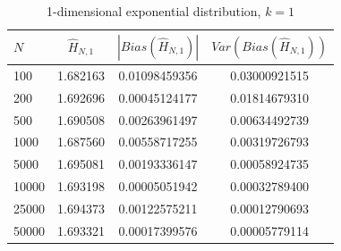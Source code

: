 \documentclass{article}
\begin{document}
\begin{table}
\caption{1-dimensional exponential distribution, $k=1$} \label{expo_k=1_table}
\begin{center}
\begin{tabular}{| l | c c c|} 
\toprule
$N$ & $\hat{H}_{N, 1}$ & $|Bias(\hat{H}_{N, 1})|$ & $Var(Bias(\hat{H}_{N, 1}))$ \\
\midrule[1pt]
100     & 1.682163     & 0.01098459356     & 0.03000921515  \\
200     & 1.692696     & 0.00045124177     & 0.01814679310  \\
500     & 1.690508     & 0.00263961497     & 0.00634492739  \\
1000    & 1.687560     & 0.00558717255     & 0.00319726793  \\
5000    & 1.695081     & 0.00193336147     & 0.00058924735  \\
10000   & 1.693198     & 0.00005051942     & 0.00032789400  \\
25000   & 1.694373     & 0.00122575211     & 0.00012790693  \\
50000   & 1.693321     & 0.00017399576     & 0.00005779114  \\
\hline
\end{tabular}
\end{center}
\end{table}
\end{document}
